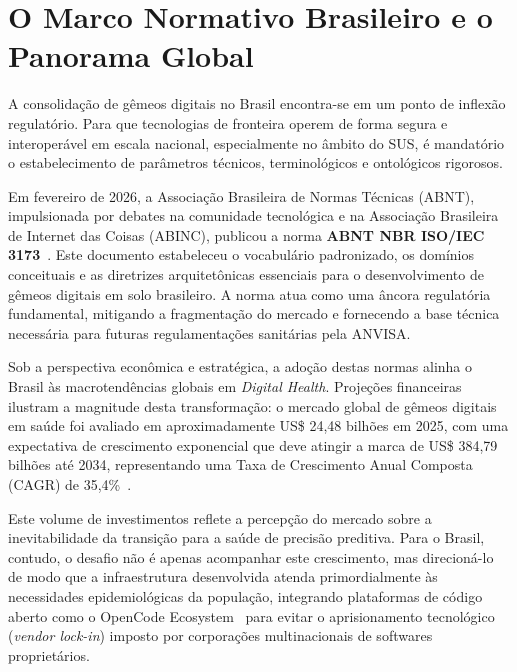 \section{O Marco Normativo Brasileiro e o Panorama Global}

A consolidação de gêmeos digitais no Brasil encontra-se em um ponto de inflexão regulatório. Para que tecnologias de fronteira operem de forma segura e interoperável em escala nacional, especialmente no âmbito do SUS, é mandatório o estabelecimento de parâmetros técnicos, terminológicos e ontológicos rigorosos. 

Em fevereiro de 2026, a Associação Brasileira de Normas Técnicas (ABNT), impulsionada por debates na comunidade tecnológica e na Associação Brasileira de Internet das Coisas (ABINC), publicou a norma \textbf{ABNT NBR ISO/IEC 3173}~\cite{abinc2026brasil}. Este documento estabeleceu o vocabulário padronizado, os domínios conceituais e as diretrizes arquitetônicas essenciais para o desenvolvimento de gêmeos digitais em solo brasileiro. A norma atua como uma âncora regulatória fundamental, mitigando a fragmentação do mercado e fornecendo a base técnica necessária para futuras regulamentações sanitárias pela ANVISA.


Sob a perspectiva econômica e estratégica, a adoção destas normas alinha o Brasil às macrotendências globais em \textit{Digital Health}. Projeções financeiras ilustram a magnitude desta transformação: o mercado global de gêmeos digitais em saúde foi avaliado em aproximadamente US\$ 24,48 bilhões em 2025, com uma expectativa de crescimento exponencial que deve atingir a marca de US\$ 384,79 bilhões até 2034, representando uma Taxa de Crescimento Anual Composta (CAGR) de 35,4\%~\cite{fortune2026digital}. 

Este volume de investimentos reflete a percepção do mercado sobre a inevitabilidade da transição para a saúde de precisão preditiva. Para o Brasil, contudo, o desafio não é apenas acompanhar este crescimento, mas direcioná-lo de modo que a infraestrutura desenvolvida atenda primordialmente às necessidades epidemiológicas da população, integrando plataformas de código aberto como o OpenCode Ecosystem~\cite{robles2023opentwins} para evitar o aprisionamento tecnológico (\textit{vendor lock-in}) imposto por corporações multinacionais de softwares proprietários.
